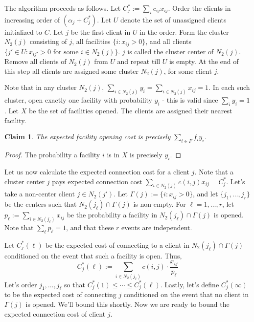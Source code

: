 \documentclass[11pt]{article}
\newtheorem{claim}{Claim}
\begin{document}
\noindent
The algorithm proceeds as follows. Let $C^*_j := \sum_i c_{ij}x_{ij}$. Order the clients in increasing order of $(\alpha_j + C^*_j)$. Let $U$ denote the set of unassigned clients initialized to $C$. Let $j$ be the first client in $U$ in the order. Form the cluster $N_2(j)$ consisting of $j$, all facilities $\{i: x_{ij} > 0\}$, and all clients 
$\{j'\in U: x_{ij'} > 0 \textrm{ for some } i\in N_2(j)\}$. $j$ is called the cluster center of $N_2(j)$.
Remove all clients of $N_2(j)$ from $U$ and repeat till $U$ is empty. At the end of this step all clients are assigned some cluster $N_2(j)$, for some client $j$. 

Note that in any cluster $N_2(j)$, $\sum_{i\in N_2(j)} y_i = \sum_{i\in N_2(j)}x_{ij} = 1$. 
In each such cluster, open exactly one facility with probability $y_i$ - this is valid since $\sum_i y_i = 1$.
Let $X$ be the set of facilities opened. The clients are assigned their nearest facility. 

\begin{claim}
The expected facility opening cost is precisely $\sum_{i\in F} f_iy_i$.
\end{claim}
\begin{proof}
The probability a facility $i$ is in $X$ is precisely $y_i$. 
\end{proof}

\noindent
Let us now calculate the expected connection cost for a client $j$. 
Note that a cluster center $j$ pays expected connection cost $\sum_{i\in N_2(j)} c(i,j)x_{ij} = C^*_j$.
Let's take a non-center client $j \in N_2(j')$. Let 
$\Gamma(j) := \{i:x_{ij}>0\}$, and let $\{j_1,\ldots,j_r\}$ be the centers 
such that $N_2(j_\ell) \cap \Gamma(j)$ is non-empty. For $\ell = 1,\ldots,r$,
let $p_\ell := \sum_{i\in N_2(j_\ell)} x_{ij}$ be the probability a facility in $N_2(j_\ell)\cap \Gamma(j)$
is opened. Note that $\sum_\ell p_\ell = 1$, and that these $r$ events are independent.

Let $C^*_j(\ell)$ be the expected  cost of connecting to a client in $N_2(j_\ell)\cap\Gamma(j)$ 
conditioned on the event that such a facility is open. Thus,
$$C^*_j(\ell) := \sum_{i\in N_2(j_\ell)} c(i,j)\cdot \frac{x_{ij}}{p_\ell}$$
Let's order $j_1,\ldots,j_\ell$ so that
$C^*_j(1) \le \cdots \le C^*_j(\ell)$. Lastly, let's define $C^*_j(\infty)$ to be the expected cost of connecting 
$j$ conditioned on the event that no client in $\Gamma(j)$ is opened. We'll bound this shortly.
Now we are ready to bound the expected connection cost of client $j$.
\end{document}
